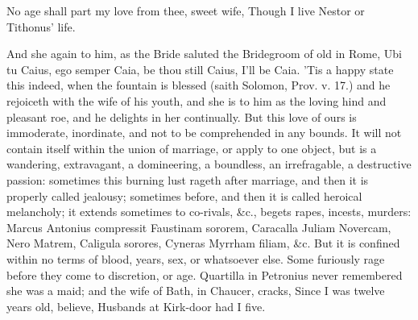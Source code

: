 {No age shall part my love from thee, sweet wife,
Though I live Nestor or Tithonus' life.

And she again to him, as the Bride saluted the Bridegroom of old
in Rome, Ubi tu Caius, ego semper Caia, be thou still Caius, I'll be
Caia.
'Tis a happy state this indeed, when the fountain is blessed (saith
Solomon, Prov. v. 17.) and he rejoiceth with the wife of his youth, and
she is to him as the loving hind and pleasant roe, and he delights in
her continually. But this love of ours is immoderate, inordinate, and
not to be comprehended in any bounds. It will not contain itself within
the union of marriage, or apply to one object, but is a wandering,
extravagant, a domineering, a boundless, an irrefragable, a destructive
passion: sometimes this burning lust rageth after marriage, and then it
is properly called jealousy; sometimes before, and then it is called
heroical melancholy; it extends sometimes to co-rivals, \&c., begets
rapes, incests, murders: Marcus Antonius compressit Faustinam sororem,
Caracalla Juliam Novercam, Nero Matrem, Caligula sorores, Cyneras
Myrrham filiam, \&c. But it is confined within no terms of blood, years,
sex, or whatsoever else. Some furiously rage before they come to
discretion, or age. Quartilla in Petronius never remembered she
was a maid; and the wife of Bath, in Chaucer, cracks,
Since I was twelve years old, believe,
Husbands at Kirk-door had I five.

}
